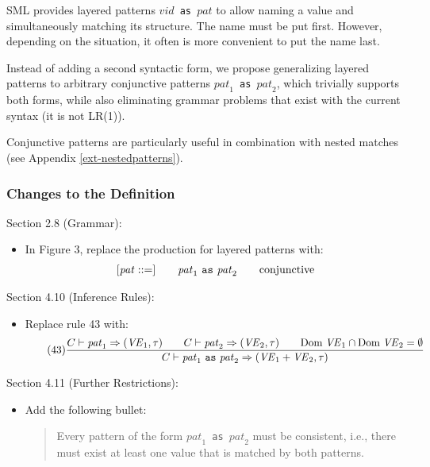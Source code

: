\documentclass[twoside,titlepage]{article}
\begin{document}
\begin{appendix}
SML provides layered patterns {\tt $\mathit{vid}$ as $\mathit{pat}$} to allow naming a value and simultaneously matching its structure. The name must be put first. However, depending on the situation, it often is more convenient to put the name last.

Instead of adding a second syntactic form, we propose generalizing layered patterns to arbitrary conjunctive patterns {\tt $\mathit{pat}_1$ as $\mathit{pat}_2$}, which trivially supports both forms, while also eliminating grammar problems that exist with the current syntax (it is not LR(1)).

Conjunctive patterns are particularly useful in combination with nested matches (see Appendix \ref{ext-nestedpatterns}).

\subsubsection*{Changes to the Definition}

Section 2.8 (Grammar):
\begin{itemize}
\item In Figure 3, replace the production for layered patterns with: 
  $$
  \begin{array}{l@{\qquad}l@{\qquad}l}
   [\mathit{pat} ::=] & \mathit{pat}_1~{\tt as}~\mathit{pat}_2 & \textrm{conjunctive}
  \end{array}
  $$
\end{itemize}

Section 4.10 (Inference Rules):
\begin{itemize}
\item Replace rule 43 with: 
  \begin{equation}
  \tag{43}
  \frac{
  C \vdash \mathit{pat}_1 \Rightarrow (\mathit{VE}_1,\tau)
  \qquad
  C \vdash \mathit{pat}_2 \Rightarrow (\mathit{VE}_2,\tau)
  \qquad
  \mbox{Dom}\; \mathit{VE}_1 \cap \mbox{Dom}\; \mathit{VE}_2 = \emptyset
  }{
  C \vdash \mathit{pat}_1~{\tt as}~\mathit{pat}_2 \Rightarrow (\mathit{VE}_1+\mathit{VE}_2,\tau)
  }
  \end{equation}
\end{itemize}

Section 4.11 (Further Restrictions):
\begin{itemize}
\item Add the following bullet: 
  \begin{quote}
  Every pattern of the form {\tt $\mathit{pat}_1$ as $\mathit{pat}_2$} must be consistent, i.e., there must exist at least one value that is matched by both patterns.
  \end{quote}
\end{itemize}


\end{appendix}
\end{document}
